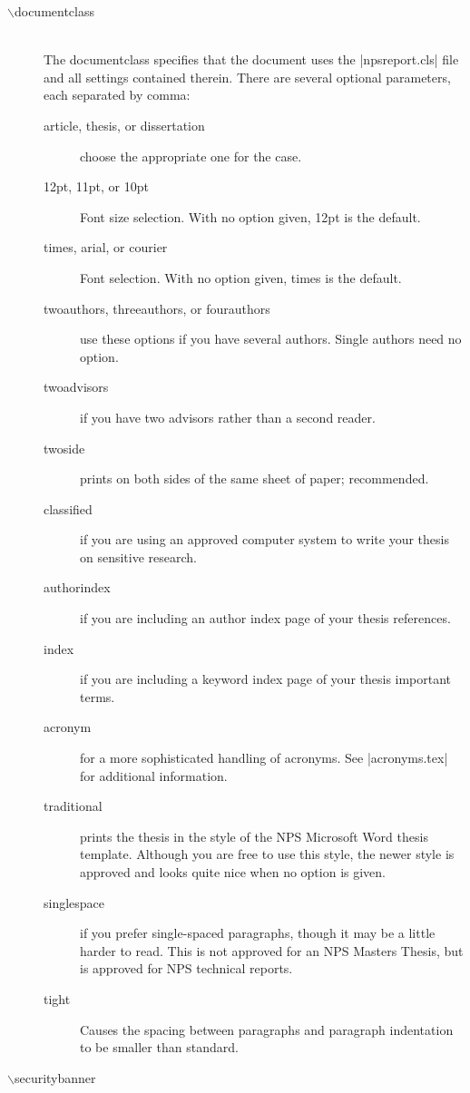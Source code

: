\begin{description}
  \item[$\backslash$documentclass] \hfill \\
  The documentclass specifies that the document uses the |npsreport.cls|
  file and all settings contained therein.  There are  several optional
  parameters, each separated by comma: 
  \begin{description}
    \item[article, thesis, or dissertation] choose the appropriate one 
    for the case.
    \item[12pt, 11pt, or 10pt] Font size selection.  With no option given, 12pt is the default.
    \item[times, arial, or courier]  Font selection.  With no option given, times is the default.
    \item[twoauthors, threeauthors, or fourauthors] use these options if you have 
    several authors.  Single authors need no option. 
    \item[twoadvisors] if you have two advisors rather than a second reader. 
    \item[twoside] prints on both sides of the same sheet of paper; recommended.
    \item[classified] if you are using an approved computer system to 
    write your thesis on sensitive research.
    \item[authorindex] if you are including an author index page of your 
    thesis references.
    \item[index] if you are including a keyword index page of your 
    thesis important terms.
    \item[acronym] for a more sophisticated handling of acronyms.  See 
    |acronyms.tex| for additional information.
    \item[traditional] prints the thesis in the style of the NPS
      Microsoft Word thesis template. Although you are free to use
      this style, the newer style is approved and looks quite nice 
    when no option is given.
    \item[singlespace] if you prefer single-spaced paragraphs, though it 
    may be a little harder to read. This is not approved for an NPS
    Masters Thesis, but is approved for NPS technical reports.
    \item[tight] Causes the spacing between paragraphs and paragraph 
    indentation to be smaller than standard.
  \end{description}
  \item[$\backslash$securitybanner] \hfill \\

\end{description}
